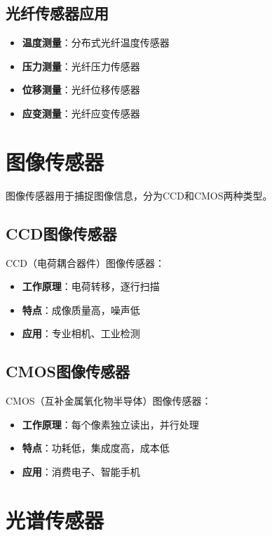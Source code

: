 \documentclass[12pt,UTF8]{ctexbook}
\begin{document}
\subsection{光纤传感器应用}

\begin{itemize}[leftmargin=2cm]
	\item \textbf{温度测量}：分布式光纤温度传感器
	\item \textbf{压力测量}：光纤压力传感器
	\item \textbf{位移测量}：光纤位移传感器
	\item \textbf{应变测量}：光纤应变传感器
\end{itemize}

\section{图像传感器}

图像传感器用于捕捉图像信息，分为CCD和CMOS两种类型。

\subsection{CCD图像传感器}

CCD（电荷耦合器件）图像传感器：

\begin{itemize}[leftmargin=2cm]
	\item \textbf{工作原理}：电荷转移，逐行扫描
	\item \textbf{特点}：成像质量高，噪声低
	\item \textbf{应用}：专业相机、工业检测
\end{itemize}

\subsection{CMOS图像传感器}

CMOS（互补金属氧化物半导体）图像传感器：

\begin{itemize}[leftmargin=2cm]
	\item \textbf{工作原理}：每个像素独立读出，并行处理
	\item \textbf{特点}：功耗低，集成度高，成本低
	\item \textbf{应用}：消费电子、智能手机
\end{itemize}

\section{光谱传感器}
\end{document}
